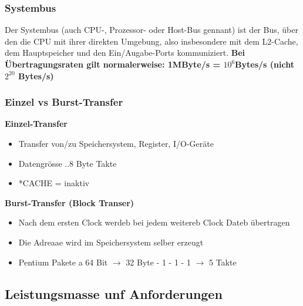 \subsubsection{Systembus}
Der Systembus (auch CPU-, Prozessor- oder Host-Bus gennant) ist der Bus, über den die CPU mit ihrer direkten Umgebung, also insbesondere mit dem L2-Cache, dem Hauptspeicher und den Ein/Augabe-Ports kommuniziert.\newline
\textbf{Bei Übertragungsraten gilt normalerweise: 1MByte/s = $ 10^6 $Bytes/s (nicht $ 2^{20}$ Bytes/s)}\newline
\vspace{-0.5cm}
\subsubsection{Einzel vs Burst-Transfer}
    \begin{minipage}{0.5\linewidth}
        \textbf{Einzel-Transfer}
        \begin{itemize}
            \item Transfer von/zu Speichersystem, Register, I/O-Geräte
            \item Datengrösse
            ..8 Byte
             Takte
            \item  *CACHE = inaktiv
        \end{itemize}
    \end{minipage}   
    \begin{minipage}{0.5\linewidth}
        \textbf{Burst-Transfer (Block Transer)}
        \begin{itemize}
            \item Nach dem ersten Clock werdeb bei jedem weitereb Clock Dateb übertragen
            \item Die Adreaae wird im Speichersystem selber erzeugt
            \item Pentium
             Pakete a 64 Bit $ \rightarrow $ 32 Byte
             - 1 - 1 - 1 $ \rightarrow $ 5 Takte
        \end{itemize}
    \end{minipage}

\subsection{Leistungsmasse unf Anforderungen}
